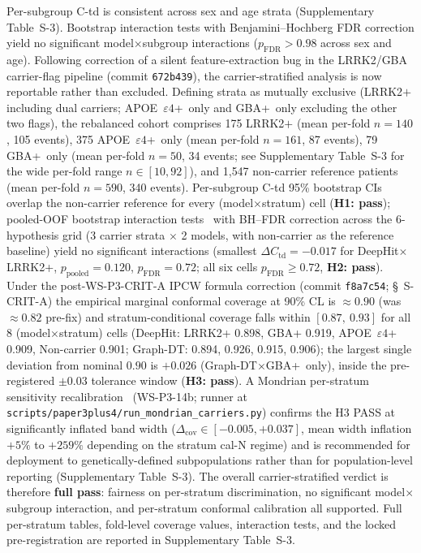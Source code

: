 \documentclass[11pt]{article}
\begin{document}
Per-subgroup C-td is consistent across sex and age strata (Supplementary Table~S-3). Bootstrap interaction tests with Benjamini--Hochberg FDR correction yield no significant model$\times$subgroup interactions ($p_{\mathrm{FDR}} > 0.98$ across sex and age). Following correction of a silent feature-extraction bug in the LRRK2/GBA carrier-flag pipeline (commit \texttt{672b439}), the carrier-stratified analysis is now reportable rather than excluded. Defining strata as mutually exclusive (LRRK2$+$ including dual carriers; APOE~$\varepsilon4$+~only and GBA+~only excluding the other two flags), the rebalanced cohort comprises 175 LRRK2$+$ (mean per-fold $n{=}140$, 105 events), 375 APOE~$\varepsilon4$+~only (mean per-fold $n{=}161$, 87 events), 79 GBA+~only (mean per-fold $n{=}50$, 34 events; see Supplementary Table~S-3 for the wide per-fold range $n{\in}[10,92]$), and 1{,}547 non-carrier reference patients (mean per-fold $n{=}590$, 340 events). Per-subgroup C-td 95\% bootstrap CIs overlap the non-carrier reference for every (model$\times$stratum) cell (\textbf{H1: pass}); pooled-OOF bootstrap interaction tests~\cite{vovk2022conformal} with BH--FDR correction across the 6-hypothesis grid (3 carrier strata $\times$ 2 models, with non-carrier as the reference baseline) yield no significant interactions (smallest $\Delta C_\mathrm{td}{=}-0.017$ for DeepHit$\times$LRRK2+, $p_\mathrm{pooled}{=}0.120$, $p_\mathrm{FDR}{=}0.72$; all six cells $p_{\mathrm{FDR}}{\geq}0.72$, \textbf{H2: pass}). Under the post-WS-P3-CRIT-A IPCW formula correction (commit \texttt{f8a7c54}; \S~S-CRIT-A) the empirical marginal conformal coverage at 90\% CL is $\approx 0.90$ (was $\approx 0.82$ pre-fix) and stratum-conditional coverage falls within $[0.87,\ 0.93]$ for all 8 (model$\times$stratum) cells (DeepHit: LRRK2+ 0.898, GBA+ 0.919, APOE~$\varepsilon4$+ 0.909, Non-carrier 0.901; Graph-DT: 0.894, 0.926, 0.915, 0.906); the largest single deviation from nominal $0.90$ is $+0.026$ (Graph-DT$\times$GBA+~only), inside the pre-registered $\pm0.03$ tolerance window (\textbf{H3: pass}). A Mondrian per-stratum sensitivity recalibration~\cite{bostrom2025mondrian,vovk2022conformal} (WS-P3-14b; runner at \texttt{scripts/paper3plus4/run\_mondrian\_carriers.py}) confirms the H3 PASS at significantly inflated band width ($\Delta_\mathrm{cov}{\in}[-0.005,+0.037]$, mean width inflation $+5\%$ to $+259\%$ depending on the stratum cal-N regime) and is recommended for deployment to genetically-defined subpopulations rather than for population-level reporting (Supplementary Table~S-3). The overall carrier-stratified verdict is therefore \textbf{full pass}: fairness on per-stratum discrimination, no significant model$\times$subgroup interaction, and per-stratum conformal calibration all supported. Full per-stratum tables, fold-level coverage values, interaction tests, and the locked pre-registration are reported in Supplementary Table~S-3.
\end{document}
